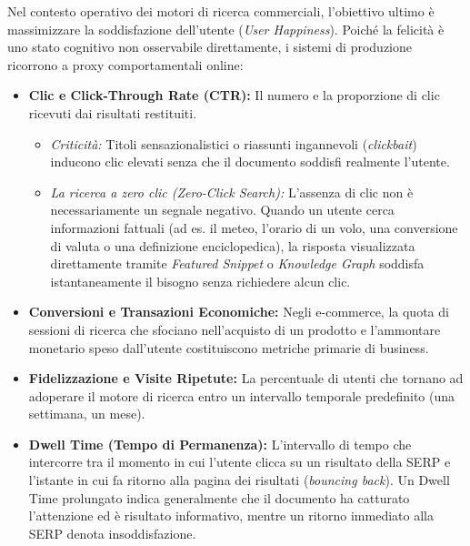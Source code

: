 Nel contesto operativo dei motori di ricerca commerciali, l'obiettivo ultimo è massimizzare la soddisfazione dell'utente (\textit{User Happiness}). Poiché la felicità è uno stato cognitivo non osservabile direttamente, i sistemi di produzione ricorrono a proxy comportamentali online:

\begin{itemize}
    \item \textbf{Clic e Click-Through Rate (CTR):} Il numero e la proporzione di clic ricevuti dai risultati restituiti.
    \begin{itemize}
        \item \textit{Criticità:} Titoli sensazionalistici o riassunti ingannevoli (\textit{clickbait}) inducono clic elevati senza che il documento soddisfi realmente l'utente.
        \item \textit{La ricerca a zero clic (\textit{Zero-Click Search}):} L'assenza di clic non è necessariamente un segnale negativo. Quando un utente cerca informazioni fattuali (ad es. il meteo, l'orario di un volo, una conversione di valuta o una definizione enciclopedica), la risposta visualizzata direttamente tramite \textit{Featured Snippet} o \textit{Knowledge Graph} soddisfa istantaneamente il bisogno senza richiedere alcun clic.
    \end{itemize}
    \item \textbf{Conversioni e Transazioni Economiche:} Negli e-commerce, la quota di sessioni di ricerca che sfociano nell'acquisto di un prodotto e l'ammontare monetario speso dall'utente costituiscono metriche primarie di business.
    \item \textbf{Fidelizzazione e Visite Ripetute:} La percentuale di utenti che tornano ad adoperare il motore di ricerca entro un intervallo temporale predefinito (una settimana, un mese).
    \item \textbf{Dwell Time (Tempo di Permanenza):} L'intervallo di tempo che intercorre tra il momento in cui l'utente clicca su un risultato della SERP e l'istante in cui fa ritorno alla pagina dei risultati (\textit{bouncing back}). Un Dwell Time prolungato indica generalmente che il documento ha catturato l'attenzione ed è risultato informativo, mentre un ritorno immediato alla SERP denota insoddisfazione.
\end{itemize}

